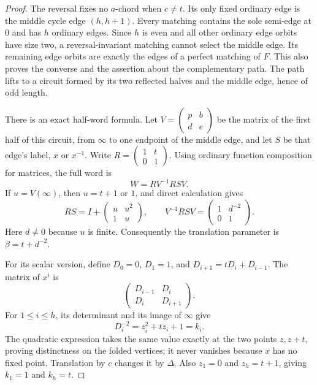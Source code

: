 \documentclass[11pt,a4paper]{article}
\theoremstyle{definition}
\theoremstyle{remark}
\begin{document}
\begin{proof}
The reversal fixes no $a$-chord when $c\ne t$.  Its only fixed ordinary edge is the middle cycle edge $(h,h+1)$.  Every matching contains the sole semi-edge at $0$ and has $h$ ordinary edges.  Since $h$ is even and all other ordinary edge orbits have size two, a reversal-invariant matching cannot select the middle edge.  Its remaining edge orbits are exactly the edges of a perfect matching of $F$.  This also proves the converse and the assertion about the complementary path.  The path lifts to a circuit formed by its two reflected halves and the middle edge, hence of odd length.

There is an exact half-word formula.  Let $V=\left(\begin{smallmatrix}p&b\\d&e\end{smallmatrix}\right)$ be the matrix of the first half of this circuit, from $\infty$ to one endpoint of the middle edge, and let $S$ be that edge's label, $x$ or $x^{-1}$.  Write $R=\left(\begin{smallmatrix}1&t\\0&1\end{smallmatrix}\right)$.  Using ordinary function composition for matrices, the full word is
\[
 W=R V^{-1}R S V.
\]
If $u=V(\infty)$, then $u=t+1$ or $1$, and direct calculation gives
\[
 RS=I+\begin{pmatrix}u&u^2\\1&u\end{pmatrix},\qquad
 V^{-1}RSV=\begin{pmatrix}1&d^{-2}\\0&1\end{pmatrix}.
\]
Here $d\ne0$ because $u$ is finite.  Consequently the translation parameter is $\beta=t+d^{-2}$.

For its scalar version, define $D_0=0$, $D_1=1$, and $D_{i+1}=tD_i+D_{i-1}$.  The matrix of $x^i$ is
\[
 \begin{pmatrix}D_{i-1}&D_i\\D_i&D_{i+1}\end{pmatrix}.
\]
For $1\le i\le h$, its determinant and its image of $\infty$ give
\[
                  D_i^{-2}=z_i^2+t z_i+1=k_i.
\]
The quadratic expression takes the same value exactly at the two points $z,z+t$, proving distinctness on the folded vertices; it never vanishes because $x$ has no fixed point.  Translation by $c$ changes it by $\Delta$.  Also $z_1=0$ and $z_h=t+1$, giving $k_1=1$ and $k_h=t$.


\end{proof}
\end{document}

